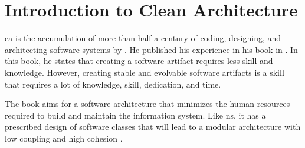 \section{Introduction to Clean Architecture} \label{sec_into_ca}

\gls{ca} is the accumulation of more than half a century of coding, designing, and
architecting software systems by \citeauthor*[]{robert_c_martin_clean_2018}. He published
his experience in his book  in
\citeyear[]{robert_c_martin_clean_2018}. In this book, he states that creating a software
artifact requires less skill and knowledge. However, creating stable and evolvable
software artifacts is a skill that requires a lot of knowledge, skill, dedication, and
time.

The book aims for a software architecture that minimizes the human resources required to
build and maintain the information system. Like \gls{ns}, it has a
prescribed design of software classes that will lead to a modular architecture with low
coupling and high cohesion \parencite{robert_c_martin_clean_2018}.
